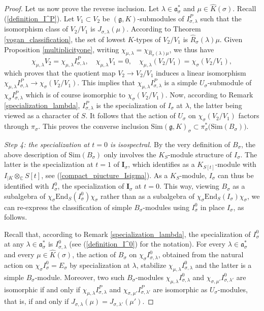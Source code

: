 \documentclass{amsart}
\theoremstyle{definition}
\begin{document}
\begin{proof}
Let us now prove the reverse inclusion. Let $\lambda \in \mathfrak{a}_\sigma^*$ and $\mu \in \widehat{K}(\sigma)$. Recall (\ref{definition_I^P}). Let $V_1 \subset V_2$ be $(\mathfrak{g},K)$-submodules of $I^P_{\sigma,\lambda}$ such that the isomorphism class of $V_2/V_1$ is $J_{\sigma,\lambda}(\mu)$. According to Theorem \ref{vogan_classification}, the set of lowest $K$-types of $V_2/V_1$ is $\hat{R}_\sigma(\lambda)\mu$. Given Proposition \ref{multiplicityone}, writing $\chi_{\mu,\lambda} = \chi_{\hat{R}_\sigma(\lambda)\mu}$, we thus have
\[\chi_{\mu,\lambda} V_2 = \chi_{\mu,\lambda} I^P_{\sigma,\lambda}, \quad \chi_{\mu,\lambda} V_1 = 0, \quad \chi_{\mu,\lambda} (V_2/V_1) = \chi_\sigma(V_2/V_1),\]
which proves that the quotient map $V_2 \to V_2/V_1$ induces a linear isomorphism $\chi_{\mu,\lambda} I^P_{\sigma,\lambda} \to \chi_\sigma(V_2/V_1)$. This implies that $\chi_{\mu,\lambda} I^P_{\sigma,\lambda}$ is a simple $U_\sigma$-submodule of $\chi_\sigma I^P_{\sigma,\lambda}$ which is of course isomorphic to $\chi_\sigma(V_2/V_1)$. Now, according to Remark \ref{specialization_lambda}, $I^P_{\sigma,\lambda}$ is the specialization of $I_\sigma$ at $\lambda$, the latter being viewed as a character of $S$. It follows that the action of $U_\sigma$ on $\chi_\sigma(V_2/V_1)$ factors through $\pi_\sigma$. This proves the converse inclusion $\mathrm{Sim}(\mathfrak{g},K)_\sigma \subset \pi_\sigma^*\big(\mathrm{Sim}(B_\sigma)\big)$.

\smallskip

\textit{Step 4: the specialization at $t = 0$ is isospectral.} By the very definition of $B_\sigma$, the above description of $\mathrm{Sim}(B_\sigma)$ only involves the $K_S$-module structure of $I_\sigma$. The latter is the specialization at $t=1$ of $\bm{I}_\sigma$, which identifies as a $K_{S[t]}$-module with $I_{|K} \otimes_\mathbb{C} S[t]$, see (\ref{compact_piucture_Isigma}). As a $K_S$-module, $I_\sigma$ can thus be identified with $I_\sigma^0$, the specialization of $\bm{I}_\sigma$ at $t=0$. This way, viewing $B_\sigma$ as a subalgebra of $\chi_\sigma \mathrm{End}_{S}(I^0_\sigma) \chi_\sigma$ rather than as a subalgebra of $\chi_\sigma \mathrm{End}_{S}(I_\sigma) \chi_\sigma$, we can re-express the classification of simple $B_\sigma$-modules using $I_\sigma^0$ in place $I_\sigma$, as follows.


Recall that, according to Remark \ref{specialization_lambda}, the specialization of $I_\sigma^0$ at any $\lambda \in \mathfrak{a}_\sigma^*$ is $I^0_{\sigma,\lambda}$ (see (\ref{definition_I^0}) for the notation). For every $\lambda \in \mathfrak{a}_\sigma^*$ and every $\mu \in \widehat{K}(\sigma)$, the action of $B_\sigma$ on $\chi_{\sigma} I^0_{\sigma,\lambda}$, obtained from the natural action on $\chi_\sigma I_\sigma^0 = E_\sigma$ by specialization at $\lambda$, stabilize $\chi_{\mu,\lambda} I^0_{\sigma,\lambda}$ and the latter is a simple $B_\sigma$-module. Moreover, two such $B_\sigma$-modules $\chi_{\mu,\lambda} I^0_{\sigma,\lambda}$ and $\chi_{\sigma,\mu'} I^0_{\sigma,\lambda'}$ are isomorphic if and only if $\chi_{\mu,\lambda} I^P_{\sigma,\lambda}$ and $\chi_{\sigma,\mu'} I^P_{\sigma,\lambda'}$ are isomorphic as $U_\sigma$-modules, that is, if and only if $J_{\sigma,\lambda}(\mu) = J_{\sigma,\lambda'}(\mu')$.


\end{proof}
\end{document}
